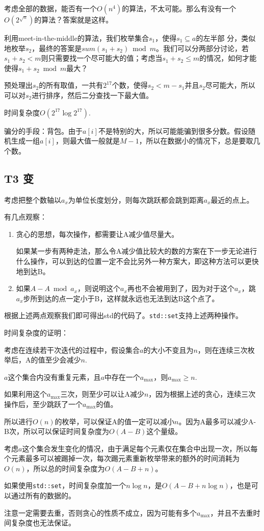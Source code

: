 考虑全部的数据，能否有一个$O(n^4)$的算法，不太可能。那么有没有一个$O(2^{\sqrt n})$的算法？答案就是这样。

利用meet-in-the-middle的算法，我们枚举集合$s_1$，使得$s_1\subseteq a的左半部$ $分$，类似地枚举$s_2$，最终的答案是$sum(s_1+s_2)\bmod m$。我们可以分两部分讨论，若$s_1+s_2<m$则只需要找一个尽可能大的值；考虑当$s_1+s_2\le m$的情况，如何才能使得$s_1+s_2\bmod m$最大？

预处理出$s_2$的所有取值，一共有$2^{17}$个数，使得$s_2<m-s_1$并且$s_2$尽可能大，所以可以对$s_2$进行排序，然后二分查找一下最大值。

时间复杂度$O(2^{17}\log 2^{17})$.

骗分的手段：背包。由于$a[i]$不是特别的大，所以可能能骗到很多分数。假设随机生成一组$a[i]$，则最大值一般就是$M-1$，所以在数据小的情况下，总是要取几个数。
\subsection{T3 变}
考虑把整个数轴以$a_x$为单位长度划分，则每次跳跃都会跳到距离$a_x$最近的点上。

有几点观察：
\begin{enumerate}
    \item{贪心的思想，每次操作，都需要让A减少值尽量大。

    如果某一步有两种走法，那么令A减少值比较大的数的方案在下一步无论进行什么操作，可以到达的位置一定不会比另外一种方案大，即这种方法可以更快地到达B。}
    \item{如果$A-A\bmod a_x$，则说明这个$a_x$再也不会被用到了，因为对于这个$a_x$，跳$a_x$步所到达的点一定小于B，这样就永远也无法到达B这个点了。}
\end{enumerate}
根据上述两点观察我们即可得出std的代码了。\verb+std::set+支持上述两种操作。

时间复杂度的证明：

考虑在连续若干次迭代的过程中，假设集合$a$的大小不变且为$n$，则在连续三次枚举后，A的值至少会减少$n$.

$a$这个集合内没有重复元素，且$a$中存在一个$a_{\max}$，则$a_{\max}\ge n$.

如果利用这个$a_{\max}$三次，则至少可以让A减少$n$，因为根据上述的贪心，连续三次操作后，至少跳跃了一个$a_{\max}$的值。

所以进行$O(n)$的枚举，可以保证A的值一定可以减小$n$。因为A最多可以减少A-B次，所以可以保证时间复杂度为$O(A-B)$这个量级。

考虑$a$这个集合发生变化的情况，由于满足每个元素仅在集合中出现一次，所以每个元素最多可以被踢掉一次，每次踢元素重新枚举带来的额外的时间消耗为$O(n)$，所以总的时间复杂度为$O(A-B+n)$。

如果使用\verb+std::set+，时间复杂度加一个$n\log n$，是$O(A-B+n\log n)$，也是可以通过所有的数据的。

注意一定需要去重，否则贪心的性质不成立，因为可能有多个$a_{\max}$，并且不去重时间复杂度也无法保证。
